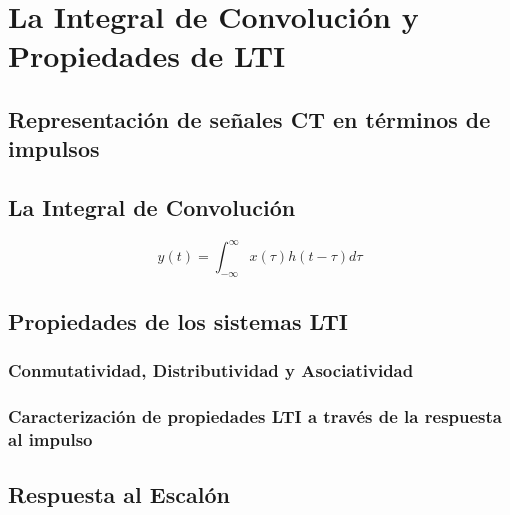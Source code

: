 \documentclass[11pt,a4paper,openany]{book}
\begin{document}
	
	\chapter{La Integral de Convolución y Propiedades de LTI}
	
	
	\section{Representación de señales CT en términos de impulsos}
	
	\section{La Integral de Convolución}
	\begin{equation}
		y(t) = \int_{-\infty}^{\infty} x(\tau)h(t-\tau) d\tau
	\end{equation}
	
	\section{Propiedades de los sistemas LTI}
	
	\subsection{Conmutatividad, Distributividad y Asociatividad}
	
	\subsection{Caracterización de propiedades LTI a través de la respuesta al impulso}
	
	\section{Respuesta al Escalón}
	
	
	\cleardoublepage
\end{document}
